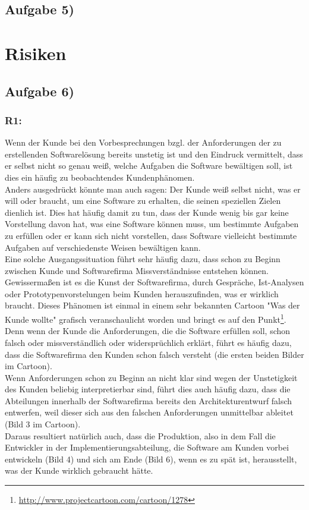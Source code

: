 \documentclass{swp1}
\begin{document}
\subsection*{Aufgabe 5)}
\section*{Risiken}     

\subsection*{Aufgabe 6)}
\subsubsection*{R1:}
Wenn der Kunde bei den Vorbesprechungen bzgl. der Anforderungen der zu erstellenden Softwarelösung bereits unstetig ist und den Eindruck vermittelt, dass er selbst nicht so genau weiß, welche Aufgaben die Software bewältigen soll, ist dies ein häufig zu beobachtendes Kundenphänomen. \\
Anders ausgedrückt könnte man auch sagen: Der Kunde weiß selbst nicht, was er will oder braucht, um eine Software zu erhalten, die seinen speziellen Zielen dienlich ist. Dies hat häufig damit zu tun, dass der Kunde wenig bis gar keine Vorstellung davon hat, was eine Software können muss, um bestimmte Aufgaben zu erfüllen oder er kann sich nicht vorstellen, dass Software vielleicht bestimmte Aufgaben auf verschiedenste Weisen bewältigen kann.\\
Eine solche Ausgangssituation führt sehr häufig dazu, dass schon zu Beginn zwischen Kunde und Softwarefirma Missverständnisse entstehen können. Gewissermaßen ist es die Kunst der Softwarefirma, durch Gespräche, Ist-Analysen oder Prototypenvorstelungen beim Kunden herauszufinden, was er wirklich braucht. Dieses Phänomen ist einmal in einem sehr bekannten Cartoon "Was der Kunde wollte" grafisch veranschaulicht worden und bringt es auf den Punkt\footnote{\url{http://www.projectcartoon.com/cartoon/1278}}.\\
Denn wenn der Kunde die Anforderungen, die die Software erfüllen soll, schon falsch oder missverständlich oder widersprüchlich erklärt, führt es häufig dazu, dass die Softwarefirma den Kunden schon falsch versteht (die ersten beiden Bilder im Cartoon). \\
Wenn Anforderungen schon zu Beginn an nicht klar sind wegen der Unstetigkeit des Kunden beliebig interpretierbar sind, führt dies auch häufig dazu, dass die Abteilungen innerhalb der Softwarefirma bereits den Architekturentwurf falsch entwerfen, weil dieser sich aus den falschen Anforderungen unmittelbar ableitet (Bild 3 im Cartoon). \\
Daraus resultiert natürlich auch, dass die Produktion, also in dem Fall die Entwickler in der Implementierungsabteilung, die Software am Kunden vorbei entwickeln (Bild 4) und sich am Ende (Bild 6), wenn es zu spät ist,  herausstellt, was der Kunde wirklich gebraucht hätte. \\
\end{document}
